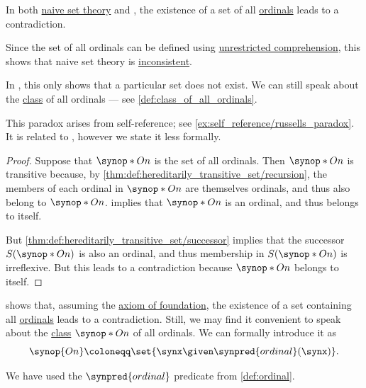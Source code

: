 \begin{theorem}\label{thm:burali_forti_paradox}
  In both \hyperref[def:naive_set_theory]{naive set theory} and \hyperref[def:zfc]{}, the existence of a set of all \hyperref[def:ordinal]{ordinals} leads to a contradiction.
\end{theorem}
\begin{comments}
  \item Since the set of all ordinals can be defined using \hyperref[def:naive_set_theory/comprehension]{unrestricted comprehension}, this shows that naive set theory is \hyperref[def:fol_theory/consistent]{inconsistent}.

  In \hyperref[def:zfc]{}, this only shows that a particular set does not exist. We can still speak about the \hyperref[con:set_theory_class]{class} of all ordinals --- see \cref{def:class_of_all_ordinals}.

  \item This paradox arises from self-reference; see \cref{ex:self_reference/russells_paradox}. It is related to , however we state it less formally.
\end{comments}
\begin{proof}
  Suppose that \( \synop*{On} \) is the set of all ordinals. Then \( \synop*{On} \) is transitive because, by \cref{thm:def:hereditarily_transitive_set/recursion}, the members of each ordinal in \( \synop*{On} \) are themselves ordinals, and thus also belong to \( \synop*{On} \).  implies that \( \synop*{On} \) is an ordinal, and thus belongs to itself.

  But \cref{thm:def:hereditarily_transitive_set/successor} implies that the successor \( S(\synop*{On}) \) is also an ordinal, and thus membership in \( S(\synop*{On}) \) is irreflexive. But this leads to a contradiction because \( \synop*{On} \) belongs to itself.
\end{proof}

\begin{definition}\label{def:class_of_all_ordinals}
   shows that, assuming the \hyperref[def:zfc/foundation]{axiom of foundation}, the existence of a set containing all \hyperref[def:ordinal]{ordinals} leads to a contradiction. Still, we may find it convenient to speak about the \hyperref[con:set_theory_class]{class} \( \synop*{On} \) of all ordinals. We can formally introduce it as
  \begin{equation*}
    \synop{On} \coloneqq \set{ \synx \given \synpred{ordinal}(\synx) }.
  \end{equation*}

  We have used the \( \synpred{ordinal} \) predicate from \cref{def:ordinal}.
\end{definition}

